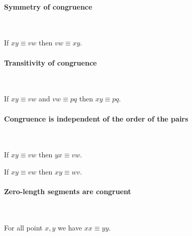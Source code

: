 \documentclass[10pt,a4paper,parskip=half,numbers=endperiod,headings=standardclasses,parskip]{scrbook}
\newcommand{\Cong}[4]{#1 #2 \equiv #3 #4}
\begin{document}
  \paragraph{Symmetry of congruence}\

  \begin{forthel}
    \begin{lemma} %
      If $\Cong{x}{y}{v}{w}$
      then $\Cong{v}{w}{x}{y}$.
    \end{lemma}
  \end{forthel}


  \paragraph{Transitivity of congruence}\

  \begin{forthel}
    \begin{lemma} %
      If $\Cong{x}{y}{v}{w}$ and $\Cong{v}{w}{p}{q}$
      then $\Cong{x}{y}{p}{q}$.
    \end{lemma}
  \end{forthel}


  \paragraph{Congruence is independent of the order of the pairs}\

  \begin{forthel}
    \begin{lemma} %
      If $\Cong{x}{y}{v}{w}$
      then $\Cong{y}{x}{v}{w}$.
    \end{lemma}

    \begin{lemma} %
      If $\Cong{x}{y}{v}{w}$
      then $\Cong{x}{y}{w}{v}$.
    \end{lemma}
  \end{forthel}


  \paragraph{Zero-length segments are congruent}\

  \begin{forthel}
    \begin{lemma} %
      For all point $x, y$ we have $\Cong{x}{x}{y}{y}$.
    \end{lemma}
  \end{forthel}
\end{document}
